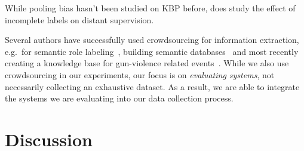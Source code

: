 While pooling bias hasn't been studied on KBP before, \cite{surdeanau} does study the effect of incomplete labels on distant supervision.

Several authors have successfully used crowdsourcing for information extraction, e.g.\ for semantic role labeling~\cite{zettlemoyer}, building semantic databases~\cite{} and most recently creating a knowledge base for gun-violence related events~\cite{pavlick}.
While we also use crowdsourcing in our experiments, our focus is on \textit{evaluating systems}, not necessarily collecting an exhaustive dataset. As a result, we are able to integrate the systems we are evaluating into our data collection process.






% 
% 
% 
% 



\section{Discussion}
\label{sec:discussion}

% 
% 
% 
% 
% 
